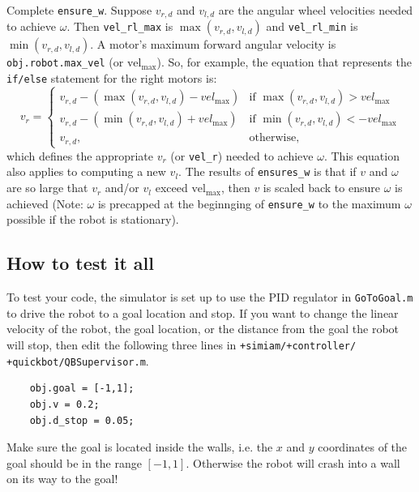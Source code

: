 \documentclass[10pt]{article}
\begin{document}
\begin{enumerate}
  Complete \texttt{ensure\_w}. Suppose $v_{r,d}$ and $v_{l,d}$ are the angular wheel velocities needed to achieve $\omega$. Then \texttt{vel\_rl\_max} is $\max(v_{r,d},v_{l,d})$ and \texttt{vel\_rl\_min} is $\min(v_{r,d},v_{l,d})$. A motor's maximum forward angular velocity is \texttt{obj.robot.max\_vel} (or $\text{vel}_{\max}$). So, for example, the equation that represents the \texttt{if/else} statement for the right motors is:
  \begin{equation*}
    v_r= 
\begin{cases}
    v_{r,d} - (\max(v_{r,d},v_{l,d})-vel_{\max})& \text{if } \max(v_{r,d},v_{l,d}) > vel_{\max}\\
    v_{r,d} - (\min(v_{r,d},v_{l,d})+vel_{\max})& \text{if } \min(v_{r,d},v_{l,d}) < -vel_{\max}\\
    v_{r,d},              & \text{otherwise},
\end{cases}
  \end{equation*}
  which defines the appropriate $v_r$ (or \texttt{vel\_r}) needed to achieve $\omega$. This equation also applies to computing a new $v_l$. The results of \texttt{ensures\_w} is that if $v$ and $\omega$ are so large that $v_r$ and/or $v_l$ exceed $\text{vel}_{\max}$, then $v$ is scaled back to ensure $\omega$ is achieved (Note: $\omega$ is precapped at the beginnging of \texttt{ensure\_w} to the maximum $\omega$ possible if the robot is stationary).
  
\end{enumerate}

\subsection*{How to test it all}

To test your code, the simulator is set up to use the PID regulator in \texttt{GoToGoal.m} to drive the robot to a goal location and stop. If you want to change the linear velocity of the robot, the goal location, or the distance from the goal the robot will stop, then edit the following three lines in \texttt{+simiam/+controller/} \texttt{+quickbot/QBSupervisor.m}.
  \begin{verbatim}
    obj.goal = [-1,1];
    obj.v = 0.2;
    obj.d_stop = 0.05;\end{verbatim}
Make sure the goal is located inside the walls, i.e. the $x$ and $y$ coordinates of the goal should be in the range $[-1,1]$. Otherwise the robot will crash into a wall on its way to the goal!
\end{document}
